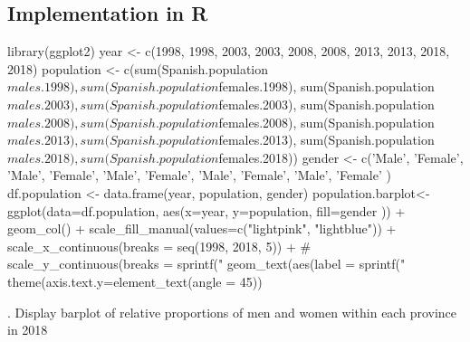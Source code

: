 \documentclass[12pt, oneside]{report}\usepackage[]{graphicx}\usepackage[]{color}
\begin{document}
\subsection*{Implementation in R}
\begin{Schunk}
\begin{Sinput}
library(ggplot2)
year <- c(1998, 1998, 2003, 2003, 2008, 2008, 2013, 2013, 2018, 2018)
population <- c(sum(Spanish.population$males.1998), 
                sum(Spanish.population$females.1998), 
                sum(Spanish.population$males.2003), 
                sum(Spanish.population$females.2003), 
                sum(Spanish.population$males.2008), 
                sum(Spanish.population$females.2008), 
                sum(Spanish.population$males.2013), 
                sum(Spanish.population$females.2013), 
                sum(Spanish.population$males.2018), 
                sum(Spanish.population$females.2018))
gender <- c('Male', 'Female', 'Male', 'Female', 'Male', 'Female', 'Male', 'Female', 'Male', 'Female' )
df.population <- data.frame(year, population, gender)
population.barplot<-ggplot(data=df.population, aes(x=year, y=population, fill=gender )) +
  geom_col() +
  scale_fill_manual(values=c("lightpink", "lightblue")) +
  scale_x_continuous(breaks = seq(1998, 2018, 5)) + 
  # scale_y_continuous(breaks = sprintf("%
  geom_text(aes(label = sprintf("%
  theme(axis.text.y=element_text(angle = 45))
\end{Sinput}
\end{Schunk}

. Display barplot of relative proportions of men and women within each province in 2018
\end{document}
